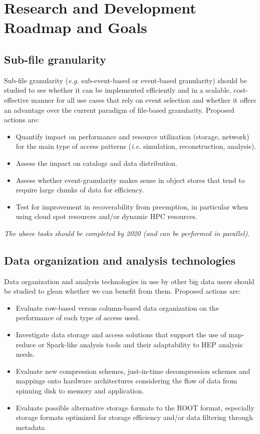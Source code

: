 \documentclass[12pt,a4paper]{article}
\begin{document}
\section{Research and Development Roadmap and
Goals}\label{research-and-development-roadmap-and-goals}

\subsection{Sub-file granularity}\label{sub-file-granularity}
Sub-file granularity ({\it e.g.} sub-event-based or event-based granularity) should be studied
to see whether it can be implemented efficiently and in a scalable, cost-effective
manner for all use cases that rely on event selection and whether it offers an advantage
over the current paradigm of file-based granularity. Proposed actions are:

\begin{itemize}
\item Quantify impact on performance
  and resource utilization (storage, network) for the main type of
  access patterns ({\it i.e.} simulation, reconstruction, analysis).
\item Assess the impact on catalogs and
  data distribution.
\item Assess whether
  event-granularity makes sense in object stores that tend to require
  large chunks of data for efficiency.
\item Test for improvement in recoverability
  from preemption, in particular when using cloud spot resources and/or
  dynamic HPC resources.
\end{itemize}

\emph{The above tasks should be completed by 2020 (and can be performed in parallel).}

\subsection{Data organization and analysis
technologies}\label{data-organization-and-analysis}
Data organization and analysis technologies in use by other big data users should be studied
to glean whether we can benefit from them. Proposed actions are:

\begin{itemize}
\item Evaluate row-based versus column-based
  data organization on the performance of each type of access used.
\item Investigate data storage and access solutions that support the use of map-reduce or
Spark-like analysis tools and their adaptability to HEP analysis needs.
\item Evaluate new compression schemes, just-in-time
  decompression schemes and mappings onto hardware architectures
  considering the flow of data from spinning disk to memory and
  application.
\item Evaluate possible alternative storage formats to the ROOT format, especially storage formats optimized for storage efficiency and/or  data filtering through metadata
\end{itemize}
\end{document}
